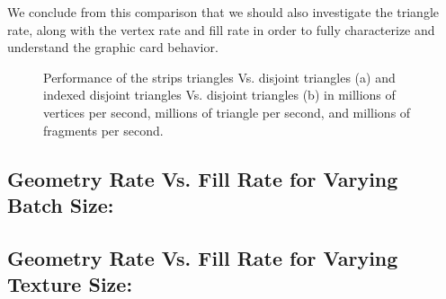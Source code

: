 We conclude from this comparison that we should also investigate the triangle rate, along with the vertex rate and fill rate in order to fully characterize and understand the graphic card behavior.
\begin{figure}[!tbh]
 \centering  
  \caption{Performance of the strips triangles Vs. disjoint triangles (a) and indexed disjoint triangles Vs. disjoint triangles (b) in millions of vertices per second, millions of triangle per second, and millions of fragments per second. }
   \label{fig:fill_geo3}
\end{figure} 


\subsection{Geometry Rate Vs. Fill Rate for Varying Batch Size:}

\subsection{Geometry Rate Vs. Fill Rate for Varying Texture Size:}